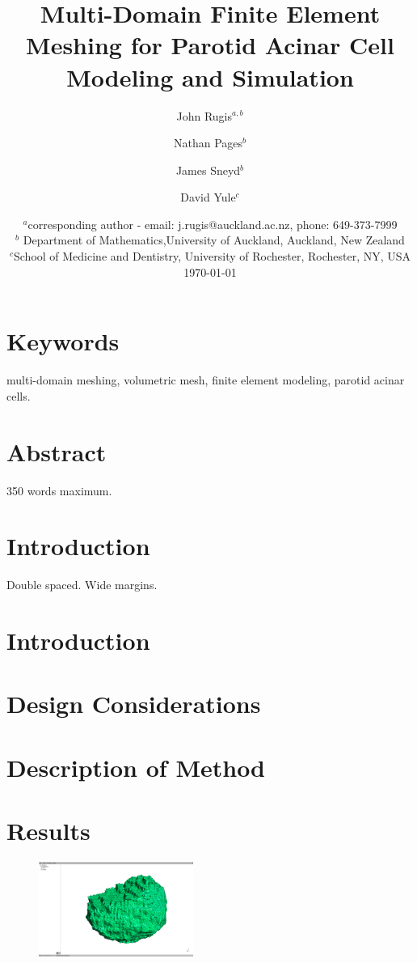 \documentclass[a4paper,10pt]{article}
\title{Multi-Domain Finite Element Meshing for Parotid Acinar Cell Modeling and Simulation}
\author{John Rugis$^{a,b}$ \and Nathan Pages$^b$ \and James Sneyd$^b$ \and David Yule$^c$}
\date{%
  $^a$corresponding author - email: j.rugis@auckland.ac.nz, phone: 649-373-7999\\%
  $^b$ Department of Mathematics,University of Auckland, Auckland, New Zealand\\%
  $^c$School of Medicine and Dentistry, University of Rochester, Rochester, NY, USA\\[2ex]%
  \today
}
\begin{document}
\maketitle

\newpage
\section*{Keywords}
multi-domain meshing, volumetric mesh, finite element modeling, parotid acinar cells.\\

\section*{Abstract}
350 words maximum.\\

\section{Introduction}
Double spaced. Wide margins.\\

\section{Introduction}

\section{Design Considerations}

\section{Description of Method}


\section{Results}
\begin{figure}[H]
\begin{center}
\includegraphics[width=0.45\textwidth]{images/cell1-00.png}
\end{center}
\end{figure}
\end{document}
